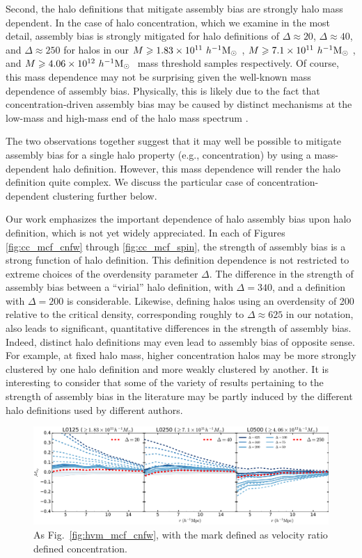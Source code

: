 \documentclass[usenatbib,fleqn]{mnras}
\begin{document}
Second, the halo definitions that mitigate assembly bias are strongly halo mass dependent. In the case of halo concentration, which we examine in the most detail, assembly bias is strongly mitigated for halo definitions of $\Delta \approx 20$, $\Delta \approx 40$, and $\Delta \approx 250$ for halos in our $M \geqslant 1.83 \times 10^{11} \ h^{-1}\mathrm{M}_{\odot}~$, $M \geqslant 7.1 \times 10^{11} \ h^{-1}\mathrm{M}_{\odot}~$, and $M \geqslant 4.06 \times 10^{12} \ h^{-1}\mathrm{M}_{\odot}~$ mass threshold samples respectively. Of course, this mass dependence may not be surprising given the well-known mass dependence of assembly bias. Physically, this is likely due to the fact that concentration-driven assembly bias may be caused by distinct mechanisms at the low-mass and high-mass end of the halo mass spectrum \citep[e.g., see][]{zentner07,wang_etal07,dalal_etal08}. 

The two observations together suggest that it may well be possible to mitigate assembly bias for a single halo property (e.g., concentration) by using a mass-dependent halo definition. However, this mass dependence will render the halo definition quite complex. We discuss the particular case of concentration-dependent clustering further below.

Our work emphasizes the important dependence of halo assembly bias upon halo definition, which is not yet widely appreciated. In each of Figures \ref{fig:cc_mcf_cnfw} through \ref{fig:cc_mcf_spin}, the strength of assembly bias is a strong function of halo definition. This definition dependence is not restricted to extreme choices of the overdensity parameter $\Delta$. The difference in the strength of assembly bias between a ``virial'' halo definition, with $\Delta=340$, and a definition with $\Delta=200$ is considerable. Likewise, defining halos using an overdensity of 200 relative to the critical density, corresponding roughly to $\Delta \approx 625$ in our notation, also leads to significant, quantitative differences in the strength of assembly bias. Indeed, distinct halo definitions may even lead to assembly bias of opposite sense. For example, at fixed halo mass, higher concentration halos may be more strongly clustered by one halo definition and more weakly clustered by another. It is interesting to consider that some of the variety of results pertaining to the strength of assembly bias in the literature may be partly induced by the different halo definitions used by different authors.

\begin{figure}
	\centering
	\includegraphics[width=\textwidth]{match_mcf_cV.pdf}
	\caption{As Fig.~\ref{fig:hvm_mcf_cnfw}, with the mark defined as velocity ratio defined concentration.
}
	\label{fig:hvm_mcf_cV}
\end{figure}
\end{document}
